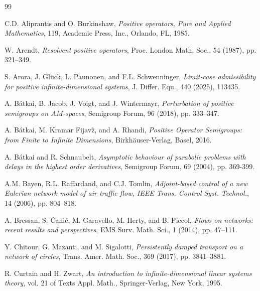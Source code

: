 \documentclass[onecolumn]{autart}
\numberwithin{equation}{section}
\begin{document}
	\begin{thebibliography}{99}	
		
		C.D. Aliprantis and O. Burkinshaw, \emph{Positive operators, Pure and Applied Mathematics}, 119, Academic Press, Inc., Orlando, FL, 1985.
		
		W. Arendt, \emph{Resolvent positive operators}, Proc. London Math. Soc., 54 (1987), pp. 321--349.	
		
		S. Arora, J. Gl\"{u}ck, L. Paunonen, and F.L. Schwenninger, \emph{Limit-case admissibility for positive infinite-dimensional systems}, J. Differ. Equ., 440 (2025), 113435.
		
		A. B\'{a}tkai, B. Jacob, J. Voigt, and J. Wintermayr, \emph{Perturbation of positive semigroups on $AM$-spaces}, Semigroup Forum, 96 (2018), pp. 333--347.
		
		A. B\'{a}tkai, M. Kramar Fijav\~{z}, and A. Rhandi, \emph{Positive Operator Semigroups: from Finite to Infinite Dimensions}, Birkh\"{a}user-Verlag, Basel, 2016.
		
		
		A. B\'{a}tkai and R. Schnaubelt, \emph{Asymptotic behaviour of parabolic problems with delays in the highest order derivatives}, Semigroup Forum, 69 (2004), pp. 369-399.
		
		
		A.M. Bayen, R.L. Raffardand, and C.J. Tomlin, \emph{Adjoint-based control of a new Eulerian network model of air traffic flow, IEEE Trans. Control Syst. Technol.}, 14 (2006), pp. 804--818.
		
		
		
		
		A. Bressan, S.  \v{C}ani\'{c}, M. Garavello, M. Herty, and B. Piccol, \emph{Flows on networks: recent results and perspectives},  EMS Surv. Math. Sci., 1 (2014), pp. 47--111.
		
		Y. Chitour, G. Mazanti, and M. Sigalotti, \emph{Persistently damped transport on a network of circles}, Trans. Amer. Math. Soc.,  369 (2017), pp. 3841--3881.
		
		
		R. Curtain and H. Zwart, \emph{An introduction to infinite-dimensional linear systems theory},
		vol.  21 of Texts Appl. Math., Springer-Verlag, New York, 1995.
		

\end{thebibliography}
\end{document}

